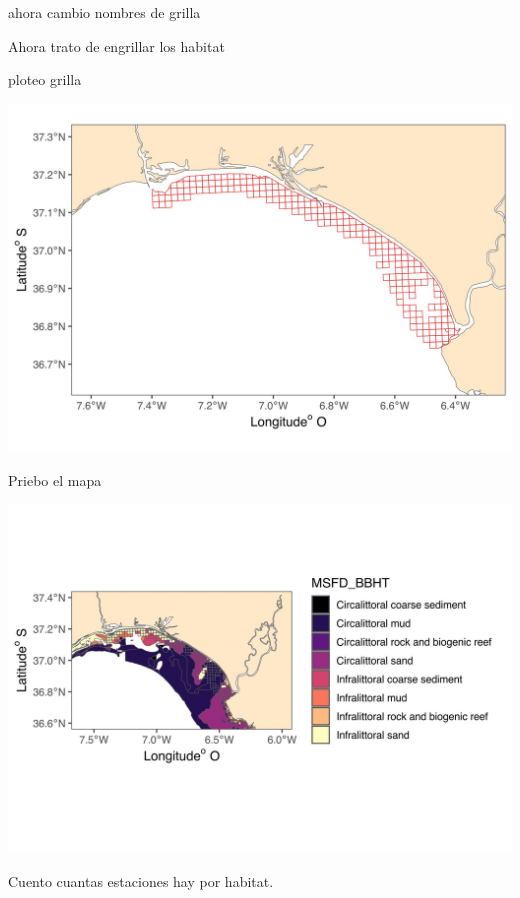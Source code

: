 \documentclass[
]{article}
\begin{document}
ahora cambio nombres de grilla

Ahora trato de engrillar los habitat

ploteo grilla

\begin{center}\includegraphics{Habitat_files/figure-latex/unnamed-chunk-3-1} \end{center}

Priebo el mapa

\begin{center}\includegraphics{Habitat_files/figure-latex/unnamed-chunk-4-1} \end{center}

Cuento cuantas estaciones hay por habitat.
\end{document}
